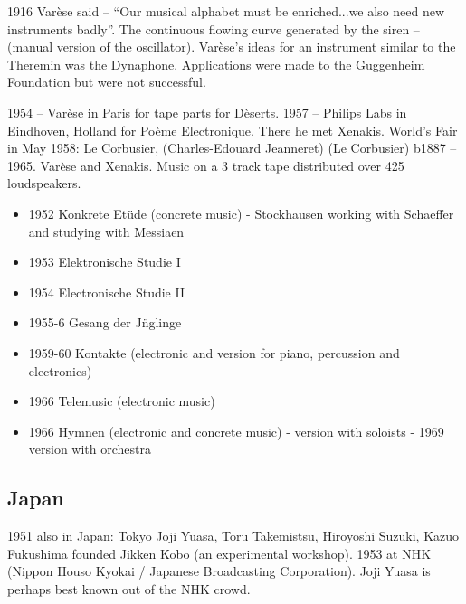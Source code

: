 1916 Varèse said – ``Our musical alphabet must be enriched...we also need new instruments badly''.  The continuous flowing curve generated by the siren – (manual version of the oscillator). Var\`ese's ideas for an instrument similar to the Theremin was the Dynaphone.  Applications were made to the Guggenheim Foundation but were not successful. 

1954 – Var\`ese in Paris for tape parts for D\`eserts. 1957 – Philips Labs in Eindhoven, Holland for Poème Electronique.  There he met Xenakis. World's Fair in May 1958: Le Corbusier, (Charles-Edouard Jeanneret) (Le Corbusier) b1887 – 1965. Var\`ese and Xenakis. Music on a 3 track tape distributed over 425 loudspeakers.

\begin{itemize}
\item 1952 Konkrete Et\"ude (concrete music) - Stockhausen working with Schaeffer and studying with Messiaen
\item 1953 Elektronische Studie I
\item 1954 Electronische Studie II
\item 1955-6 Gesang der J\"nglinge
\item 1959-60 Kontakte (electronic and version for piano, percussion and electronics)
\item 1966 Telemusic (electronic music)
\item 1966 Hymnen (electronic and concrete music) - version with soloists - 1969 version with orchestra
\end{itemize}

\subsection{Japan}
1951 also in Japan: Tokyo
Joji Yuasa, Toru Takemistsu, Hiroyoshi Suzuki, Kazuo Fukushima founded Jikken Kobo (an experimental workshop). 1953 at NHK (Nippon Houso Kyokai / Japanese Broadcasting Corporation).  Joji Yuasa is perhaps best known out of the NHK crowd.

